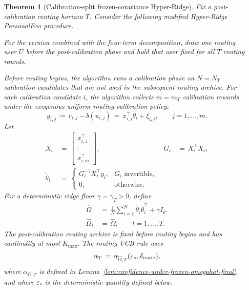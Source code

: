 \documentclass{article} %
\newtheorem{theorem}{Theorem}
\begin{document}
\begin{theorem}[Calibration-split frozen-covariance Hyper-Ridge]
\label{thm:err-control-calibration-split-final}
Fix a post-calibration routing horizon \(T\).  Consider the following modified
Hyper-Ridge PersonalEvo procedure.

For the version combined with the four-term decomposition, draw one routing
user \(U\) before the post-calibration phase and hold that user fixed for all
\(T\) routing rounds.

Before routing begins, the algorithm runs a calibration phase on
\(N=N_T\) calibration candidates that are not used in the subsequent routing
archive.  For each calibration candidate \(i\), the algorithm collects
\(m=m_T\) calibration rewards under the exogenous uniform-routing calibration
policy:
\begin{equation}
y_{i,j}
\,\coloneqq\,
r_{i,j}-b(u_{i,j})
\,=\,
x_{i,j}^{\top}\theta_i+\xi_{i,j},
\qquad j=1,\ldots,m.
\end{equation}
Let
\begin{equation}
\begin{aligned}
X_i
&\,=\,
\begin{bmatrix}
x_{i,1}^{\top}\\
\vdots\\
x_{i,m}^{\top}
\end{bmatrix},
&
G_i
&\,=\,
X_i^\top X_i,
\\
\widetilde\theta_i
&\,=\,
\begin{cases}
G_i^{-1}X_i^\top y_i, & G_i\text{ invertible},\\
0, & \text{otherwise}.
\end{cases}
\end{aligned}
\end{equation}
For a deterministic ridge floor \(\gamma=\gamma_T>0\), define
\begin{equation}
\begin{aligned}
\widehat\Omega
&\,=\,
\frac1N\sum_{i=1}^N\widetilde\theta_i\widetilde\theta_i^\top+\gamma I_d.
\\
\widehat\Omega_t
&\,=\,
\widehat\Omega,
\qquad t=1,\ldots,T.
\end{aligned}
\end{equation}
The post-calibration routing archive is fixed before routing begins and has
cardinality at most \(K_{\max}\).  The routing UCB rule uses
\begin{equation}
\alpha_T
\,=\,
\alpha_{\widehat\Omega,T}(\varepsilon_*,\delta_{\rm route}),
\end{equation}
where \(\alpha_{\widehat\Omega,T}\) is defined in
Lemma~\ref{lem:confidence-under-frozen-omegahat-final}, and where
\(\varepsilon_*\) is the deterministic quantity defined below.


\end{theorem}
\end{document}
